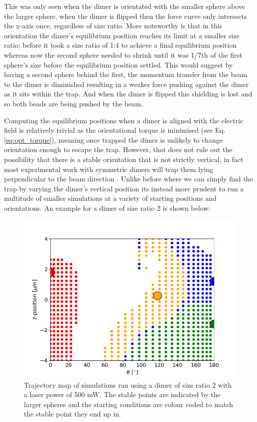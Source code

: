 \documentclass[a4paper,oneside,11pt]{book}
\begin{document}
This was only seen when the dimer is orientated with the smaller sphere above the larger sphere, when the dimer is flipped then the force curve only intersects the x-axis once, regardless of size ratio. More noteworthy is that in this orientation the dimer’s equilibrium position reaches its limit at a smaller size ratio; before it took a size ratio of 1:4 to achieve a final equilibrium position whereas now the second sphere needed to shrink until it was 1/7th of the first sphere’s size before the equilibrium position settled. This would suggest by having a second sphere behind the first, the momentum transfer from the beam to the dimer is diminished resulting in a weaker force pushing against the dimer as it sits within the trap. And when the dimer is flipped this shielding is lost and so both beads are being pushed by the beam.

Computing the equilibrium positions when a dimer is aligned with the electric field is relatively trivial as the orientational torque is minimised (see Eq.\ref{eq:opt_torque}), meaning once trapped the dimer is unlikely to change orientation enough to escape the trap. However, that does not rule out the possibility that there is a stable orientation that is not strictly vertical, in fact most experimental work with symmetric dimers will trap them lying perpendicular to the beam direction \cite{Ahn2018}. Unlike before where we can simply find the trap by varying the dimer's vertical position its instead more prudent to run a multitude of smaller simulations at a variety of starting positions and orientations. An example for a dimer of size ratio 2 is shown below:

\begin{figure}
	\centering
	\includegraphics[width=0.75\linewidth]{figs/off_axis_trap.png}
	\caption{Trajectory map of simulations ran using a dimer of size ratio 2 with a laser power of 500 mW. The stable points are indicated by the larger spheres and the starting conditions are colour coded to match the stable point they end up in.}
\end{figure}
\end{document}

